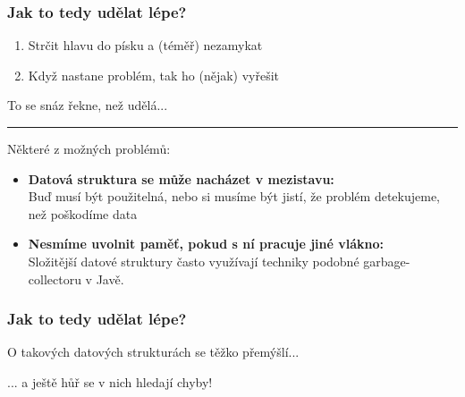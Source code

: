 \documentclass[usenames,dvipsnames,9pt]{beamer}
\begin{document}
\begin{frame}
  \frametitle{Jak to tedy udělat lépe?}
  \begin{enumerate}
    \item \Large Strčit hlavu do písku a (téměř) nezamykat
    \item \Large Když nastane problém, tak ho (nějak) vyřešit
  \end{enumerate}
  \hfill To se snáz řekne, než udělá...

  \pause\vspace{1em}\hrule\vspace{1em}
  Některé z možných problémů:
  \begin{itemize}
    \item \textbf{Datová struktura se může nacházet v mezistavu:}\\
          Buď musí být použitelná, nebo si musíme být jistí, že problém detekujeme, než poškodíme data
    \item \textbf{Nesmíme uvolnit paměť, pokud s ní pracuje jiné vlákno:}\\
          Složitější datové struktury často využívají techniky podobné garbage-collectoru v Javě.
  \end{itemize}
\end{frame}

\begin{frame}
  \frametitle{Jak to tedy udělat lépe?}
  O takových datových strukturách se těžko přemýšlí...

  \hfill ... a ještě hůř se v nich hledají chyby!

  \vspace{2em}

  \small{}

\end{frame}





\end{document}
